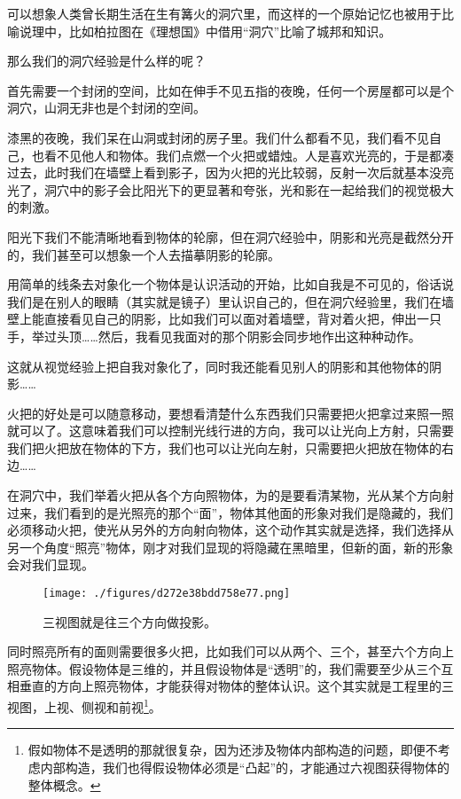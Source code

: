 可以想象人类曾长期生活在生有篝火的洞穴里，而这样的一个原始记忆也被用于比喻说理中，比如柏拉图在《理想国》中借用“洞穴”比喻了城邦和知识。

那么我们的洞穴经验是什么样的呢？

首先需要一个封闭的空间，比如在伸手不见五指的夜晚，任何一个房屋都可以是个洞穴，山洞无非也是个封闭的空间。

漆黑的夜晚，我们呆在山洞或封闭的房子里。我们什么都看不见，我们看不见自己，也看不见他人和物体。我们点燃一个火把或蜡烛。人是喜欢光亮的，于是都凑过去，此时我们在墙壁上看到影子，因为火把的光比较弱，反射一次后就基本没亮光了，洞穴中的影子会比阳光下的更显著和夸张，光和影在一起给我们的视觉极大的刺激。

阳光下我们不能清晰地看到物体的轮廓，但在洞穴经验中，阴影和光亮是截然分开的，我们甚至可以想象一个人去描摹阴影的轮廓。

用简单的线条去对象化一个物体是认识活动的开始，比如自我是不可见的，俗话说我们是在别人的眼睛（其实就是镜子）里认识自己的，但在洞穴经验里，我们在墙壁上能直接看见自己的阴影，比如我们可以面对着墙壁，背对着火把，伸出一只手，举过头顶……然后，我看见我面对的那个阴影会同步地作出这种种动作。

这就从视觉经验上把自我对象化了，同时我还能看见别人的阴影和其他物体的阴影……

火把的好处是可以随意移动，要想看清楚什么东西我们只需要把火把拿过来照一照就可以了。这意味着我们可以控制光线行进的方向，我可以让光向上方射，只需要我们把火把放在物体的下方，我们也可以让光向左射，只需要把火把放在物体的右边……

在洞穴中，我们举着火把从各个方向照物体，为的是要看清某物，光从某个方向射过来，我们看到的是光照亮的那个“面”，物体其他面的形象对我们是隐藏的，我们必须移动火把，使光从另外的方向射向物体，这个动作其实就是选择，我们选择从另一个角度“照亮”物体，刚才对我们显现的将隐藏在黑暗里，但新的面，新的形象会对我们显现。

\begin{figure}[ht]
\centering
\texttt{[image: ./figures/d272e38bdd758e77.png]}
\caption{三视图就是往三个⽅向做投影。} \label{fig_QMPre3_5}
\end{figure}

同时照亮所有的面则需要很多火把，比如我们可以从两个、三个，甚至六个方向上照亮物体。假设物体是三维的，并且假设物体是“透明”的，我们需要至少从三个互相垂直的方向上照亮物体，才能获得对物体的整体认识。这个其实就是工程里的三视图，上视、侧视和前视\footnote{假如物体不是透明的那就很复杂，因为还涉及物体内部构造的问题，即便不考虑内部构造，我们也得假设物体必须是“凸起”的，才能通过六视图获得物体的整体概念。}。


